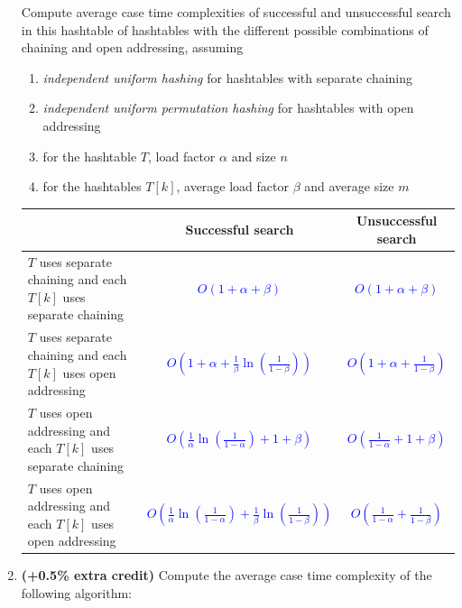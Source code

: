 \documentclass[dvipsnames]{article}
\begin{document}
\begin{enumerate}
    Compute average case time complexities of successful and unsuccessful search in this hashtable of hashtables
    with the different possible combinations of chaining and open addressing, assuming
    \begin{enumerate}
      \item \emph{independent uniform hashing} for hashtables with separate chaining~\cite[\S 11.2]{Cormen2022}
      \item \emph{independent uniform permutation hashing} for hashtables with open addressing~\cite[\S 11.4]{Cormen2022}
      \item for the hashtable $T$, load factor $\alpha$ and size $n$
      \item for the hashtables $T[k]$, average load factor $\beta$ and average size $m$
    \end{enumerate}

    \begin{center}
      \small
    \bgroup
    \def\arraystretch{1.2}%
    \begin{tabular}{ |p{9cm}||c|c| }
     \hline
       & Successful search & Unsuccessful search \\
     \hline
     \hline
     $T$ uses separate chaining and each $T[k]$ uses separate chaining & \textcolor{blue}{\emph{$O(1+\alpha + \beta)$}} & \textcolor{blue}{\emph{$O(1+\alpha + \beta)$}} \\
     \hline
     $T$ uses separate chaining and each $T[k]$ uses open addressing & \textcolor{blue}{\emph{$O(1+\alpha + \frac{1}{\beta} \ln (\frac{1}{1-\beta}))$}} & \textcolor{blue}{\emph{$O(1+\alpha + \frac{1}{1-\beta})$}} \\
     \hline
     $T$ uses open addressing and each $T[k]$ uses separate chaining & \textcolor{blue}{\emph{$O(\frac{1}{\alpha} \ln (\frac{1}{1-\alpha}) + 1+\beta)$}} & \textcolor{blue}{\emph{$O(\frac{1}{1-\alpha} + 1+\beta)$}} \\
     \hline
     $T$ uses open addressing and each $T[k]$ uses open addressing & \textcolor{blue}{\emph{$O(\frac{1}{\alpha} \ln (\frac{1}{1-\alpha}) + \frac{1}{\beta} \ln (\frac{1}{1-\beta}))$}} & \textcolor{blue}{\emph{$O(\frac{1}{1-\alpha} + \frac{1}{1-\beta})$}} \\
     \hline
    \end{tabular}
    \egroup
    \normalsize
    \end{center}

  \item \textbf{(+0.5\% extra credit)}
    Compute the average case time complexity of the following algorithm:


\end{enumerate}
\end{document}
